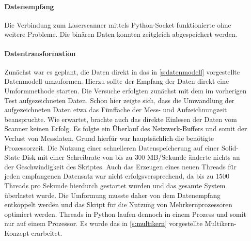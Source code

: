 \documentclass[a4paper,12pt,bibliography=totoc, listof=totoc,titlepage,pointlessnumbers]{scrreprt}
\begin{document}
\paragraph{Datenempfang}
Die Verbindung zum Laser\-scan\-ner mittels Python-Socket funktionierte ohne weitere Probleme. Die binären Daten konnten zeitgleich abgespeichert werden.

\paragraph{Datentransformation}
Zunächst war es geplant, die Daten direkt in das in \autoref{s:datenmodell} vorgestellte Datenmodell umzuformen. Hierzu sollte der Empfang der Daten direkt eine Umformmethode starten. Die Versuche erfolgten zunächst mit dem im vorherigen Test aufgezeichneten Daten. Schon hier zeigte sich, dass die Umwandlung der aufgezeichneten Daten etwa das Fünffache der Mess- und Aufzeichnungzeit beanspruchte. Wie erwartet, brachte auch das direkte Einlesen der Daten vom Scanner keinen Erfolg. Es folgte ein Überlauf des Netzwerk-Buffers und somit der Verlust von Messdaten. Grund hierfür war hauptsächlich die benötigte Prozessorzeit. Die Nutzung einer schnelleren Datenspeicherung auf einer Solid-State-Disk mit einer Schreibrate von bis zu 300 MB/Sekunde änderte nichts an der Geschwindigkeit des Skriptes. Auch das Erzeugen eines neuen Threads für jeden empfangenen Datensatz war nicht erfolgsversprechend, da bis zu 1500 Threads pro Sekunde hierdurch gestartet wurden und das gesamte System überlastet wurde. Die Umformung musste daher von dem Datenempfang entkoppelt werden und das Skript für die Nutzung von Mehrkernprozessoren optimiert werden. Threads in Python laufen dennoch in einem Prozess und somit nur auf einem Prozessor. Es wurde das in \autoref{s:multikern} vorgestellte Multikern-Konzept erarbeitet.
\end{document}
